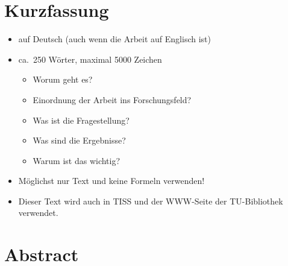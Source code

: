\cleardoublepage


\chapter*{Kurzfassung}
\thispagestyle{empty}

\begin{itemize}
  \item auf Deutsch (auch wenn die Arbeit auf Englisch ist)
  \item ca.\ 250 Wörter, maximal 5000 Zeichen
        \begin{itemize}
          \item Worum geht es?
          \item Einordnung der Arbeit ins Forschungsfeld?
          \item Was ist die Fragestellung?
          \item Was sind die Ergebnisse?
          \item Warum ist das wichtig?
        \end{itemize}
  \item Möglichst nur Text und keine Formeln verwenden!
  \item Dieser Text wird auch in TISS und der WWW-Seite der TU-Bibliothek verwendet.
\end{itemize}

\cleardoublepage


\chapter*{Abstract}
\thispagestyle{empty}

